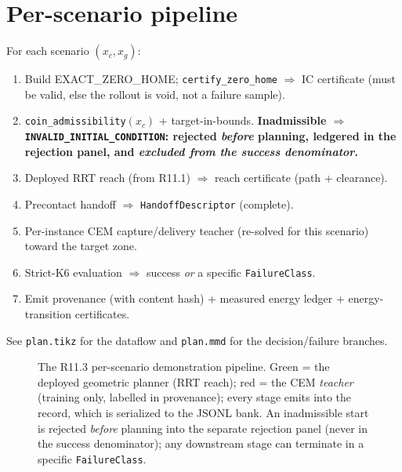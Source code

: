 \documentclass[11pt]{article}
\newcommand{\code}[1]{\texttt{\small #1}}
\begin{document}
\section{Per-scenario pipeline}
For each scenario $(x_c, x_g)$:
\begin{enumerate}[nosep,leftmargin=1.6em]
  \item Build EXACT\_ZERO\_HOME; \code{certify\_zero\_home} $\Rightarrow$ IC certificate (must be valid, else the rollout is
  void, not a failure sample).
  \item \code{coin\_admissibility}$(x_c)$ + target-in-bounds. \textbf{Inadmissible $\Rightarrow$ \code{INVALID\_INITIAL\_CONDITION}:
  rejected \emph{before} planning, ledgered in the rejection panel, and \emph{excluded from the success denominator}.}
  \item Deployed RRT reach (from R11.1) $\Rightarrow$ reach certificate (path + clearance).
  \item Precontact handoff $\Rightarrow$ \code{HandoffDescriptor} (complete).
  \item Per-instance CEM capture/delivery teacher (re-solved for this scenario) toward the target zone.
  \item Strict-K6 evaluation $\Rightarrow$ success \emph{or} a specific \code{FailureClass}.
  \item Emit provenance (with content hash) + measured energy ledger + energy-transition certificates.
\end{enumerate}
See \code{plan.tikz} for the dataflow and \code{plan.mmd} for the decision/failure branches.

\begin{figure}[h]\centering\caption{The R11.3 per-scenario demonstration pipeline. Green = the
deployed geometric planner (RRT reach); red = the CEM \emph{teacher} (training only, labelled in provenance); every stage
emits into the record, which is serialized to the JSONL bank. An inadmissible start is rejected \emph{before} planning into
the separate rejection panel (never in the success denominator); any downstream stage can terminate in a specific
\code{FailureClass}.}\end{figure}
\end{document}
